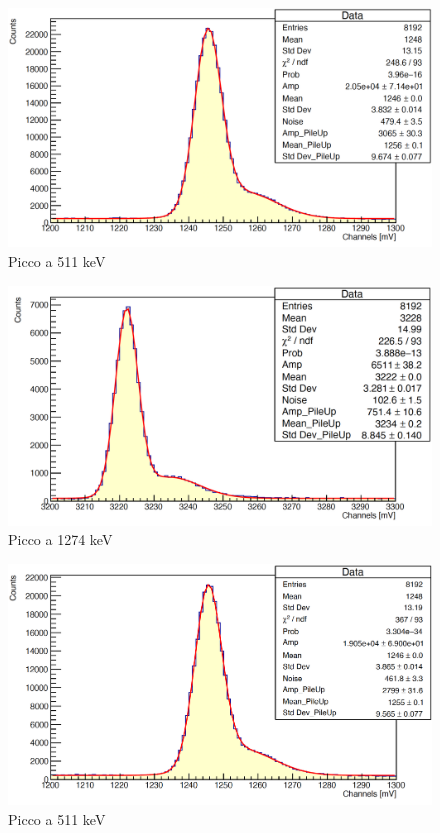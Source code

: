 \documentclass[a4paper,10pt]{article}
\begin{document}
\begin{figure}[H]
    \centering
    \includegraphics[scale=0.45]{appendice/spettri/NaCu1_44}
    \caption{Picco a 511 keV}
\end{figure}
\begin{figure}[H]
    \centering
    \includegraphics[scale=0.45]{appendice/spettri/NaCu2_44}
    \caption{Picco a 1274 keV}
\end{figure}
\begin{figure}[H]
    \centering
    \includegraphics[scale=0.45]{appendice/spettri/NaCu1_54}
    \caption{Picco a 511 keV}
\end{figure}
\end{document}
